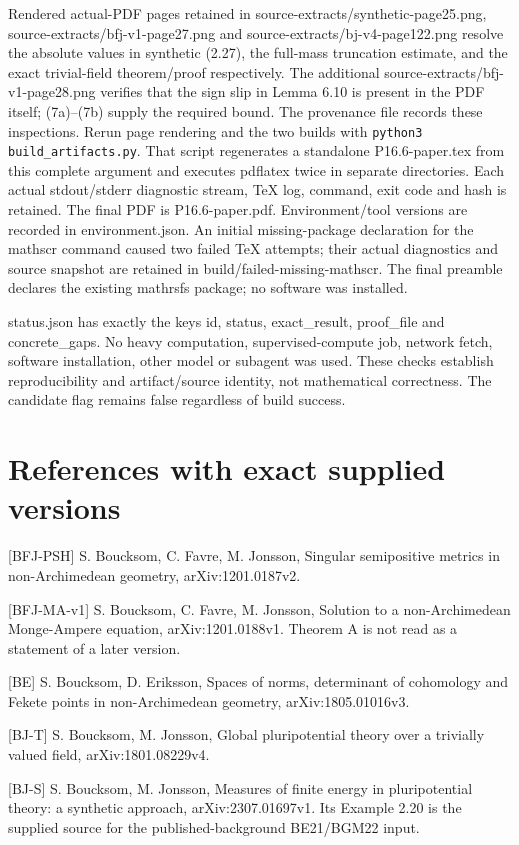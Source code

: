 \documentclass[11pt]{article}
\begin{document}
Rendered actual-PDF pages retained in source-extracts/synthetic-page25.png, source-extracts/bfj-v1-page27.png and source-extracts/bj-v4-page122.png resolve the absolute values in synthetic (2.27), the full-mass truncation estimate, and the exact trivial-field theorem/proof respectively. The additional source-extracts/bfj-v1-page28.png verifies that the sign slip in Lemma 6.10 is present in the PDF itself; (7a)--(7b) supply the required bound. The provenance file records these inspections. Rerun page rendering and the two builds with \texttt{python3 build\_artifacts.py}. That script regenerates a standalone P16.6-paper.tex from this complete argument and executes pdflatex twice in separate directories. Each actual stdout/stderr diagnostic stream, TeX log, command, exit code and hash is retained. The final PDF is P16.6-paper.pdf. Environment/tool versions are recorded in environment.json. An initial missing-package declaration for the mathscr command caused two failed TeX attempts; their actual diagnostics and source snapshot are retained in build/failed-missing-mathscr. The final preamble declares the existing mathrsfs package; no software was installed.

status.json has exactly the keys id, status, exact\_result, proof\_file and concrete\_gaps. No heavy computation, supervised-compute job, network fetch, software installation, other model or subagent was used. These checks establish reproducibility and artifact/source identity, not mathematical correctness. The candidate flag remains false regardless of build success.

\section*{References with exact supplied versions}

[BFJ-PSH] S. Boucksom, C. Favre, M. Jonsson, Singular semipositive metrics in non-Archimedean geometry, arXiv:1201.0187v2.

[BFJ-MA-v1] S. Boucksom, C. Favre, M. Jonsson, Solution to a non-Archimedean Monge-Ampere equation, arXiv:1201.0188v1. Theorem A is not read as a statement of a later version.

[BE] S. Boucksom, D. Eriksson, Spaces of norms, determinant of cohomology and Fekete points in non-Archimedean geometry, arXiv:1805.01016v3.

[BJ-T] S. Boucksom, M. Jonsson, Global pluripotential theory over a trivially valued field, arXiv:1801.08229v4.

[BJ-S] S. Boucksom, M. Jonsson, Measures of finite energy in pluripotential theory: a synthetic approach, arXiv:2307.01697v1. Its Example 2.20 is the supplied source for the published-background BE21/BGM22 input.
\end{document}
